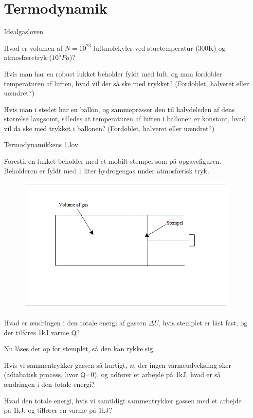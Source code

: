 \documentclass[crop=false, class=memoir]{standalone}
\begin{document}
\section{Termodynamik}

\begin{opgave}{Idealgasloven}

\opg Hvad er volumen af $N=10^{23}$ luftmolekyler ved stuetemperatur (300K) og atmosfæretryk ($10^5Pa$)?

\opg Hvis man har en robust lukket beholder fyldt med luft, og man fordobler temperaturen af luften, hvad vil der så ske med trykket? (Fordoblet, halveret eller uændret?)

\opg Hvis man i stedet har en ballon, og sammepresser den til halvdeleden af dens størrelse langsomt, således at temperaturen af luften i ballonen er konstant, hvad vil da ske med trykket i ballonen? (Fordoblet, halveret eller uændret?)

\end{opgave}

\begin{opgave}{Termodynamikkens 1.lov}

\noindent
Forestil en lukket beholder med et mobilt stempel som på opgavefiguren. Beholderen er fyldt med 1 liter hydrogengas under atmosfærisk tryk.

\begin{figure}[H]
    \centering
    \includegraphics[scale=0.7]{Termodynamik/fig/Term1.png}
\end{figure}

\opg  Hvad er ændringen i den totale energi af gassen $\Delta U$, hvis stemplet er låst fast, og der tilføres 1kJ varme Q?

\noindent
Nu låses der op for stemplet, så den kan rykke sig.

\opg Hvis vi sammentrykker gassen så hurtigt, at der ingen varmeudveksling sker (adiabatisk process, hvor Q=0), og udfører et arbejde på 1kJ, hvad er så ændringen i den totale energi?

\opg Hvad den totale energi, hvis vi samtidigt sammentrykker gassen med et arbejde på 1kJ, og tilfører en varme på 1kJ?
\end{opgave}
\end{document}
